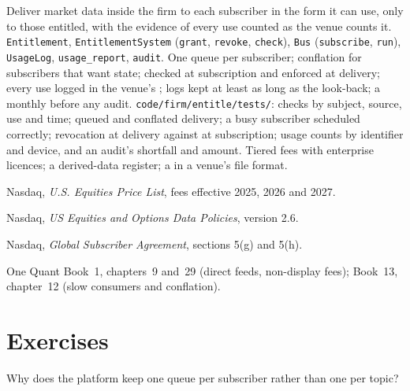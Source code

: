 \begin{build}
 Deliver market data inside the firm to each subscriber in the form it can use, only to those entitled, with the evidence of
every use counted as the venue counts it.
 \texttt{Entitlement}, \texttt{EntitlementSystem} (\texttt{grant}, \texttt{revoke}, \texttt{check}), \texttt{Bus}
(\texttt{subscribe}, \texttt{run}), \texttt{UsageLog}, \texttt{usage\_report}, \texttt{audit}.
 One queue per subscriber; conflation for subscribers that want state;  checked at subscription and enforced at
delivery; every use logged in the venue's ; logs kept at least as long as the look-back; a monthly  before any
audit.
 \texttt{code/firm/entitle/tests/}: checks by subject, source, use and time; queued and conflated delivery; a busy
subscriber scheduled correctly; revocation at delivery against at subscription; usage counts by identifier and device, and an audit's
shortfall and amount.
 Tiered fees with enterprise licences; a derived-data register; a  in a venue's file format.
\end{build}

\begin{omsources}
\item Nasdaq, \emph{U.S. Equities Price List}, fees effective 2025, 2026 and 2027.
\item Nasdaq, \emph{US Equities and Options Data Policies}, version 2.6.
\item Nasdaq, \emph{Global Subscriber Agreement}, sections 5(g) and 5(h).
\item One Quant Book~1, chapters~9 and~29 (direct feeds, non-display fees); Book~13, chapter~12 (slow consumers and conflation).
\end{omsources}

\section{Exercises}

\begin{exercise}[$\star$]\label{exo:pl:market-data-distribution-and-entitlements:1}
Why does the platform keep one queue per subscriber rather than one per topic?
\end{exercise}

